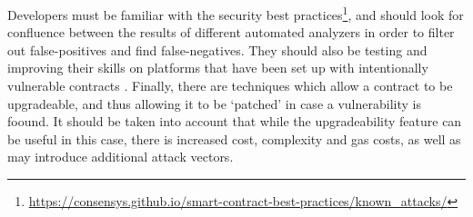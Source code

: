 
Developers must be familiar with the security best practices\footnote{\url{https://consensys.github.io/smart-contract-best-practices/known_attacks/}}, and should look for confluence between the results of different automated analyzers in order to filter out false-positives and find false-negatives. They should also be testing and improving their skills on platforms that have been set up with intentionally vulnerable contracts \cite{ethernaut, hackthiscontract, capturetheether}. Finally, there are techniques which allow a contract to be upgradeable, and thus allowing it to be `patched' in case a vulnerability is foound. It should be taken into account that while the upgradeability feature can be useful in this case, there is increased cost, complexity and gas costs, as well as may introduce additional attack vectors. 